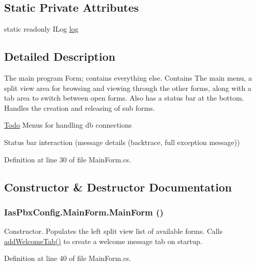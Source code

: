 \subsection*{Static Private Attributes}
\begin{DoxyCompactItemize}
\item 
static readonly ILog \hyperlink{class_ias_pbx_config_1_1_main_form_a8851a476622496a7d2d08e1879eafa72}{log}
\end{DoxyCompactItemize}


\subsection{Detailed Description}
The main program Form; contains everything else. Contains The main menu, a split view area for browsing and viewing through the other forms, along with a tab area to switch between open forms. Also has a status bar at the bottom. Handles the creation and releasing of sub forms.

\begin{Desc}
\item[\hyperlink{todo__todo000037}{Todo}]Menus for handling db connections 

Status bar interaction (message details (backtrace, full exception message)) \end{Desc}


Definition at line 30 of file MainForm.cs.

\subsection{Constructor \& Destructor Documentation}
\hypertarget{class_ias_pbx_config_1_1_main_form_a5a90f1985458908bd2aa0e29fbfda5de}{
\subsubsection[{MainForm}]{\setlength{\rightskip}{0pt plus 5cm}IasPbxConfig.MainForm.MainForm ()}}
\label{class_ias_pbx_config_1_1_main_form_a5a90f1985458908bd2aa0e29fbfda5de}


Constructor. Populates the left split view list of available forms. Calls \hyperlink{class_ias_pbx_config_1_1_main_form_ae464d50243315dc81ede782996ae3258}{addWelcomeTab()} to create a welcome message tab on startup. 

Definition at line 40 of file MainForm.cs.

